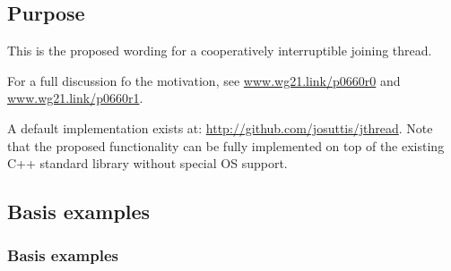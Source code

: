 \subsection*{Purpose}

This is the proposed wording for a cooperatively interruptible joining thread.

For a full discussion fo the motivation, see
\url{www.wg21.link/p0660r0} and
\url{www.wg21.link/p0660r1}.

A default implementation exists at:
\url{http://github.com/josuttis/jthread}.
Note that the proposed functionality can be fully implemented 
on top of the existing C++ standard library without special OS support.

\subsection*{Basis examples}

\subsubsection*{Basis  examples}

